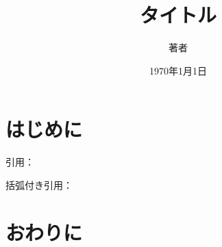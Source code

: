 \documentclass[uplatex,dvipdfmx]{jsarticle}
\begin{document}
\title{タイトル}
\author{著者}
\date{1970年1月1日}

\maketitle


\section{はじめに}\label{sec:introduction}

引用：~\textcite{latex_template_ja}

括弧付き引用：~\parencite{latex_template_ja}

\section{おわりに}\label{sec:conclusion}


\printbibliography[heading=bibliography, title={Bibliography}]
\end{document}
